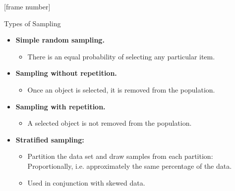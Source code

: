 \documentclass[aspectratio=169,t]{beamer}
\begin{document}
  {
    [frame number]
    \begin{frame}{Types of Sampling}
        \begin{itemize}
            \item \textbf{Simple random sampling.}
            \begin{itemize}
              \item There is an equal probability of selecting any particular item.
            \end{itemize}
            \item \textbf{Sampling without repetition.}
            \begin{itemize}
              \item Once an object is selected, it is removed from the population.
            \end{itemize}
            \item \textbf{Sampling with repetition.}
            \begin{itemize}
              \item A selected object is not removed from the population.
            \end{itemize}
            \item \textbf{Stratified sampling:}
            \begin{itemize}
              \item Partition the data set and draw samples from each partition: Proportionally, i.e. approximately the same percentage of the data.
              \item Used in conjunction with skewed data.
            \end{itemize}
        \end{itemize}
    \end{frame}
  }
\end{document}
